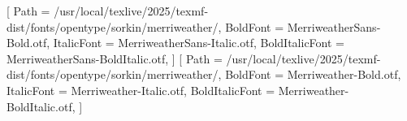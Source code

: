 \documentclass[
  customlatinfont = macos,
]{hkustthesis}
\begin{document}
\newfontfamily{}[
  Path = /usr/local/texlive/2025/texmf-dist/fonts/opentype/sorkin/merriweather/,
  BoldFont = MerriweatherSans-Bold.otf,
  ItalicFont = MerriweatherSans-Italic.otf,
  BoldItalicFont = MerriweatherSans-BoldItalic.otf,
]
\newfontfamily{}[
  Path = /usr/local/texlive/2025/texmf-dist/fonts/opentype/sorkin/merriweather/,
  BoldFont = Merriweather-Bold.otf,
  ItalicFont = Merriweather-Italic.otf,
  BoldItalicFont = Merriweather-BoldItalic.otf,
]
\thispagestyle{empty}
\end{document}
